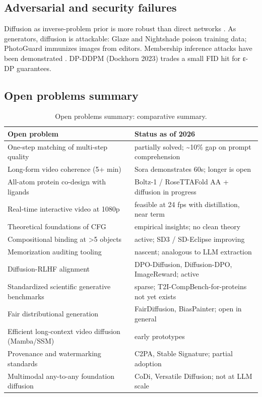 \documentclass{article}
\begin{document}
\subsection{Adversarial and security failures}\label{adversarial-and-security-failures}

Diffusion as inverse-problem prior is more robust than direct networks \citep{wang20232023}. As generators, diffusion is attackable: Glaze and Nightshade poison training data; PhotoGuard immunizes images from editors. Membership inference attacks have been demonstrated \citep{carlini2023extractingtraining}. DP-DDPM (Dockhorn 2023) trades a small FID hit for ε-DP guarantees.

\subsection{Open problems summary}\label{open-problems-summary}

\begin{table}[t]
\centering
\caption{Open problems summary: comparative summary.}
\label{tab:open-problems-summary}
\begin{tabular}{>{\raggedright\arraybackslash}p{0.5000\linewidth}
  >{\raggedright\arraybackslash}p{0.5000\linewidth}}
\toprule
Open problem & Status as of 2026 \\
\midrule
One-step matching of multi-step quality & partially solved; \textasciitilde10\% gap on prompt comprehension \\
Long-form video coherence (5+ min) & Sora demonstrates 60s; longer is open \\
All-atom protein co-design with ligands & Boltz-1 / RoseTTAFold AA + diffusion in progress \\
Real-time interactive video at 1080p & feasible at 24 fps with distillation, near term \\
Theoretical foundations of CFG & empirical insights; no clean theory \\
Compositional binding at \textgreater5 objects & active; SD3 / SD-Eclipse improving \\
Memorization auditing tooling & nascent; analogous to LLM extraction \\
Diffusion-RLHF alignment & DPO-Diffusion, Diffusion-DPO, ImageReward; active \\
Standardized scientific generative benchmarks & sparse; T2I-CompBench-for-proteins not yet exists \\
Fair distributional generation & FairDiffusion, BiasPainter; open in general \\
Efficient long-context video diffusion (Mamba/SSM) & early prototypes \\
Provenance and watermarking standards & C2PA, Stable Signature; partial adoption \\
Multimodal any-to-any foundation diffusion & CoDi, Versatile Diffusion; not at LLM scale \\
\end{tabular}
\end{table}
\end{document}
